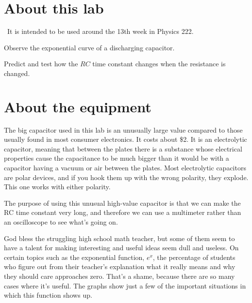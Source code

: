 \renewcommand\thechapter{c2.13a}
\label{lab:rc-circuits}

\section*{About this lab}

\covid\ 
It is intended to be used around the 13th week in Physics 222.

\apparatus
{}

\begin{goals}

\item[] Observe the exponential curve of a discharging capacitor.

\item[] Predict and test how the $RC$ time constant changes when the resistance is changed.
\end{goals}

\section*{About the equipment}

The big capacitor used in this lab is an unusually large value compared to those usually found
in most consumer electronics. It costs about \$2. It is an electrolytic capacitor, meaning that
between the plates there is a substance whose electrical properties cause the capacitance to
be much bigger than it would be with a capacitor having a vacuum or air between the plates.
Most electrolytic capacitors are polar devices, and if you hook them up with the wrong polarity,
they explode. This one works with either polarity.

The purpose of using this unusual high-value capacitor is that we can make the RC time constant
very long, and therefore we can use a multimeter rather than an oscilloscope to see what's going
on.

\introduction

God bless the struggling high school math teacher, but some
of them seem to have a talent for making interesting and
useful ideas seem dull and useless. On certain topics such
as the exponential function, $e^x$, the percentage of students
who figure out from their teacher's explanation what it
really means and why they should care approaches zero.
That's a shame, because there are so many cases where it's
useful. The graphs show just a few of the important
situations in which this function shows up.

